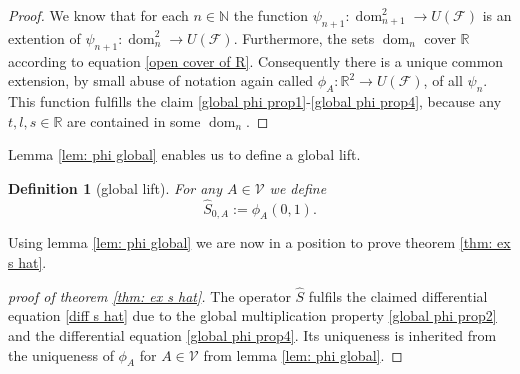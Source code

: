 \documentclass[b5paper,draft,openbib,12pt]{memoir}
\newtheorem{Def}{Definition}
\DeclareMathOperator{\dom}{dom}
\begin{document}
\begin{proof}
We know that for each \(n\in\mathbb{N}\) the function
\(\psi_{n+1}:\dom_{n+1}^2\rightarrow U(\mathcal{F})\) is 
an extention of 
\(\psi_{n+1}:\dom_{n}^2\rightarrow U(\mathcal{F})\).
Furthermore, the sets \(\dom_n\) cover 
\(\mathbb{R}\) according 
to equation \eqref{open cover of R}. Consequently 
there is a unique common extension, by small abuse of 
notation again called 
\(\phi_A:\mathbb{R}^2\to U(\mathcal{F})\), 
of all \(\psi_n\). This function fulfills the claim 
\eqref{global phi prop1}-\eqref{global phi prop4}, because 
any \(t,l,s\in\mathbb{R}\) are contained in some \(\dom_n\).



\end{proof}

Lemma \ref{lem: phi global} enables us to define a global lift.
\begin{Def}[global lift]\label{de: s hat}
For any \(A\in\mathcal{V}\) we define 
\begin{equation}
\hat{S}_{0,A}:=\phi_A(0,1).
\end{equation}
\end{Def}
Using lemma  \ref{lem: phi global} we are now in a position
to prove theorem \ref{thm: ex s hat}.
\begin{proof}[proof of theorem \ref{thm: ex s hat}]
The operator \(\hat{S}\) fulfils the claimed differential 
equation \eqref{diff s hat} due to the global 
multiplication property 
\eqref{global phi prop2} and the differential 
equation \eqref{global phi prop4}.
Its uniqueness is inherited from the 
uniqueness of \(\phi_A\) for \(A\in\mathcal{V}\)
from lemma \ref{lem: phi global}.
\end{proof}



\end{document}
